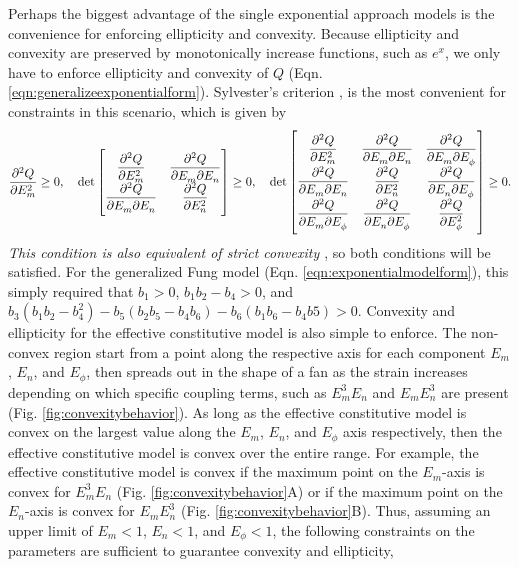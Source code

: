 	Perhaps the biggest advantage of the single exponential approach models is the convenience for enforcing ellipticity and convexity. Because ellipticity and convexity are preserved by monotonically increase functions, such as $e^x$, we only have to enforce ellipticity and convexity of $Q$ (Eqn. \ref{eqn:generalizeexponentialform}). Sylvester's criterion \cite{gilbert_positive_1991}, is the most convenient for constraints in this scenario, which is given by 
\begin{equation}\label{eqn:convexitycriteria}
\begin{aligned}
\dpd[2]{Q}{E_m} \geq 0, \quad
\det
\begin{bmatrix}
\dpd[2]{Q}{E_m} & \dmd{Q}{2}{E_m}{}{E_n}{}\\
\dmd{Q}{2}{E_m}{}{E_n}{} & \dpd[2]{Q}{E_n}\\
\end{bmatrix} \geq0, \quad
\det
\begin{bmatrix}
\dpd[2]{Q}{E_m} & \dmd{Q}{2}{E_m}{}{E_n}{} & \dmd{Q}{2}{E_m}{}{E_\phi}{}\\
\dmd{Q}{2}{E_m}{}{E_n}{} & \dpd[2]{Q}{E_n} & \dmd{Q}{2}{E_n}{}{E_\phi}{}\\
\dmd{Q}{2}{E_m}{}{E_\phi}{} & \dmd{Q}{2}{E_n}{}{E_\phi}{} & \dpd[2]{Q}{E_\phi} \\
\end{bmatrix} \geq0.
\end{aligned}
\end{equation}
\emph{This condition is also equivalent of strict convexity \cite{ball_strict_1980}}, so both conditions will be satisfied. For the generalized Fung model (Eqn. \ref{eqn:exponentialmodelform}), this simply required that $b_1>0$, $b_1b_2-b_4>0$, and $b_3(b_1b_2 - b_4^2) - b_5(b_2b_5 - b_4b_6) - b_6(b_1b_6 - b_4b5)>0$. Convexity and ellipticity for the effective constitutive model is also simple to enforce. The non-convex region start from a point along the respective axis for each component $E_m$, $E_n$, and $E_\phi$, then spreads out in the shape of a fan as the strain increases depending on which specific coupling terms, such as $E_m^3 E_n$ and $E_m E_n^3$ are present (Fig. \ref{fig:convexitybehavior}). As long as the effective constitutive model is convex on the largest value along the $E_m$, $E_n$, and $E_\phi$ axis respectively, then the effective constitutive model is convex over the entire range. For example, the effective constitutive model is convex if the maximum point on the $E_m$-axis is convex for $E_m^3 E_n$ (Fig. \ref{fig:convexitybehavior}A) or if the maximum point on the $E_n$-axis is convex for $E_m E_n^3$ (Fig. \ref{fig:convexitybehavior}B). Thus, assuming an upper limit of $E_m < 1$, $E_n < 1$, and $E_\phi < 1$, the following constraints on the parameters are sufficient to guarantee convexity and ellipticity,
